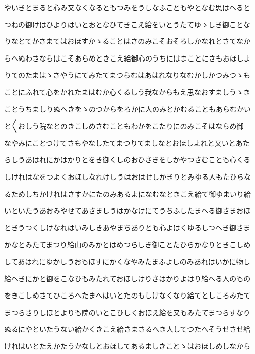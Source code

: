 \documentclass[a4paper,11pt,landscape]{ltjtarticle}
\begin{document}
\par\medskip
やいきとまると心み又なくなるともつみをうしなふこともやとなむ思はへると
\par\medskip
つねの御けはひよりはいとおとなひてきこえ給をいとうたてゆゝしき御ことな
\par\medskip
りなとてかさまてはおほすかゝることはさのみこそおそろしかなれとさてなか
\par\medskip
らへぬわさならはこそあらめときこえ給御心のうちにはまことにさもおほしよ
\par\medskip
りてのたまはゝさやうにてみたてまつらむはあはれなりなむかしかつみつゝも
\par\medskip
ことにふれて心をかれたまはむか心くるしう我なからもえ思なおすましうゝき
\par\medskip
ことうちましりぬへきをゝのつからをろかに人のみとかむることもあらむかい
\par\medskip
と〱おしう院なとのきこしめさむこともわかをこたりにのみこそはならめ御
\par\medskip
なやみにことつけてさもやなしたてまつりてましなとおほしよれと又いとあた
\par\medskip
らしうあはれにかはかりとをき御くしのおひさきをしかやつさむことも心くる
\par\medskip
しけれはなをつよくおほしなれけしうはおはせしかきりとみゆる人もたひらな
\par\medskip
るためしちかけれはさすかにたのみあるよになむなときこえ給て御ゆまいり給
\par\medskip
いといたうあおみやせてあさましうはかなけにてうちふしたまへる御さまおほ
\par\medskip
ときうつくしけなれはいみしきあやまちありとも心よはくゆるしつへき御さま
\par\medskip
かなとみたてまつり給山のみかとはめつらしき御ことたひらかなりときこしめ
\par\medskip
してあはれにゆかしうおもほすにかくなやみたまふよしのみあれはいかに物し
\par\medskip
給へきにかと御をこなひもみたれておほしけりさはかりよはり給へる人のもの
\par\medskip
をきこしめさてひころへたまへはいとたのもしけなくなり給てとしころみたて
\par\medskip
まつらさりしほとよりも院のいとこひしくおほえ給を又もみたてまつらすなり
\par\medskip
ぬるにやといたうない給かくきこえ給さまさるへき人してつたへそうせさせ給
\par\medskip
けれはいとたえかたうかなしとおほしてあるましきことゝはおほしめしなから
\end{document}
